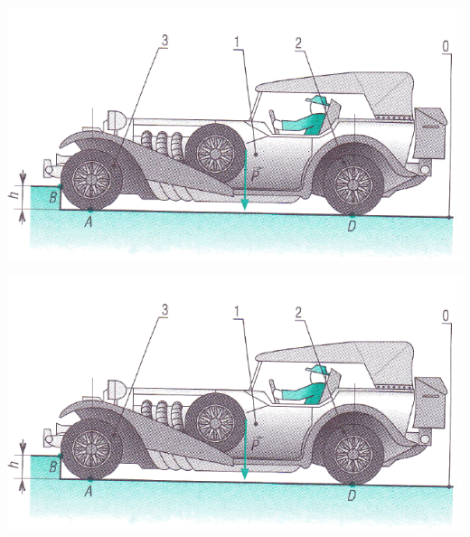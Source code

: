 \documentclass[10pt]{article}
\begin{document}
\begin{center}
\includegraphics[width=.75\textwidth]{images/voiture}
\end{center}

\begin{center}
\includegraphics[width=.75\textwidth]{images/voiture}
\end{center}
\end{document}
